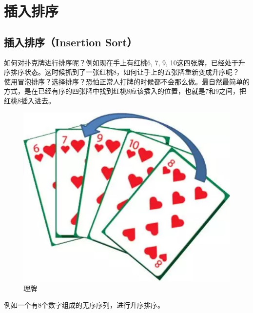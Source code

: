 \newpage

\section{插入排序}

\subsection{插入排序（Insertion Sort）}

如何对扑克牌进行排序呢？例如现在手上有红桃6, 7, 9, 10这四张牌，已经处于升序排序状态。这时候抓到了一张红桃8，如何让手上的五张牌重新变成升序呢？\\

使用冒泡排序？选择排序？恐怕正常人打牌的时候都不会那么做。最自然最简单的方式，是在已经有序的四张牌中找到红桃8应该插入的位置，也就是7和9之间，把红桃8插入进去。

\begin{figure}[H]
	\centering
	\includegraphics[scale=0.4]{img/C8/8-4/1.png}
	\caption{理牌}
\end{figure}

例如一个有8个数字组成的无序序列，进行升序排序。

